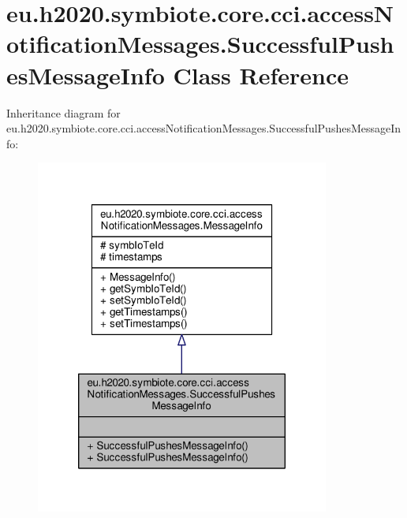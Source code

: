 \hypertarget{classeu_1_1h2020_1_1symbiote_1_1core_1_1cci_1_1accessNotificationMessages_1_1SuccessfulPushesMessageInfo}{}\section{eu.\+h2020.\+symbiote.\+core.\+cci.\+access\+Notification\+Messages.\+Successful\+Pushes\+Message\+Info Class Reference}
\label{classeu_1_1h2020_1_1symbiote_1_1core_1_1cci_1_1accessNotificationMessages_1_1SuccessfulPushesMessageInfo}


Inheritance diagram for eu.\+h2020.\+symbiote.\+core.\+cci.\+access\+Notification\+Messages.\+Successful\+Pushes\+Message\+Info\+:\nopagebreak
\begin{figure}[H]
\begin{center}
\leavevmode
\includegraphics[width=274pt]{classeu_1_1h2020_1_1symbiote_1_1core_1_1cci_1_1accessNotificationMessages_1_1SuccessfulPushesMessageInfo__inherit__graph}
\end{center}
\end{figure}


